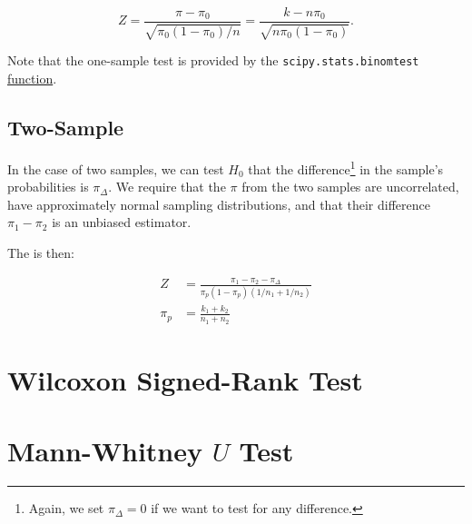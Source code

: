 \begin{equation}\label{eq:hypo:binomial_test:one}
Z = \frac{\pi - \pi_{0}}{\sqrt{\pi_{0}\left(1-\pi_{0}\right)/n}} = \frac{k - n \pi_{0}}{\sqrt{n\pi_{0}\left(1-\pi_{0}\right)}}.
\end{equation}

Note that the one-sample test is provided by the
\texttt{scipy.stats.binomtest} \href{https://docs.scipy.org/doc/scipy/reference/generated/scipy.stats.binomtest.html}{function}.

\subsection{Two-Sample}
\label{hypo:binomial_test:two}

In the case of two samples, we can test $H_{0}$
that the difference\footnote{Again, we set $\pi_{\Delta} = 0$ if we want to test for any difference.} in the sample's probabilities is $\pi_{\Delta}$.
We require that the $\pi$ from the two samples are uncorrelated,
have approximately normal sampling distributions,
and that their difference $\pi_{1} - \pi_{2}$ is an unbiased estimator.

The \Zscore is then:

\begin{subequations}\label{eq:hypo:binomial_test:two}
\begin{align}
Z &= \frac{\pi_{1} - \pi_{2} - \pi_{\Delta}}{\pi_{p} \left(1-\pi_{p}\right)\left(1/n_{1} + 1/n_{2}\right)} \label{eq:hypo:binomial_test:two:Z} \\
\pi_{p} &= \frac{k_{1} + k_{2}}{n_{1} + n_{2}} \label{eq:hypo:binomial_test:two:pi_p}
\end{align}
\end{subequations}

\section{Wilcoxon Signed-Rank Test}
\label{hypo:wilcoxon_test}

\section{Mann-Whitney \texorpdfstring{$U$}{U} Test}
\label{hypo:mann_whitney_U_test}


